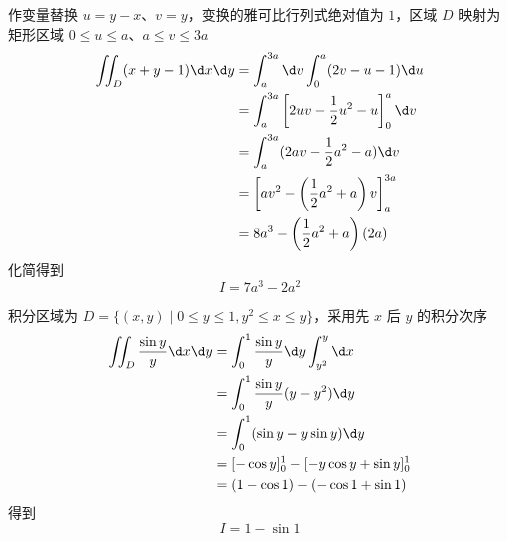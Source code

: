 \begin{solution}
    作变量替换 $u = y-x$、$v = y$，变换的雅可比行列式绝对值为 $1$，区域 $D$ 映射为矩形区域 $0 \le u \le a$、$a \le v \le 3a$
    \begin{equation}
        \begin{aligned}
            \iint_{D} (x+y-1) \d x \d y & = \int_{a}^{3 a} \d v \int_{0}^{a} (2 v - u - 1) \d u                       \\
                                        & = \int_{a}^{3 a} \left[ 2 u v - \frac{1}{2} u^{2} - u \right]_{0}^{a} \d v  \\
                                        & = \int_{a}^{3 a} (2 a v - \frac{1}{2} a^{2} - a) \d v                       \\
                                        & = \left[ a v^{2} - \left( \frac{1}{2} a^{2} + a \right) v \right]_{a}^{3 a} \\
                                        & = 8 a^{3} - \left( \frac{1}{2} a^{2} + a \right) (2 a)
        \end{aligned}
    \end{equation}
    化简得到
    \begin{equation}
        I = \boxed{7 a^{3}-2 a^{2}}
    \end{equation}


    积分区域为 $D = \{ (x, y) \mid 0 \le y \le 1, y^{2} \le x \le y \}$，采用先 $x$ 后 $y$ 的积分次序
    \begin{equation}
        \begin{aligned}
            \iint_{D} \frac{\sin y}{y} \d x \d y & = \int_{0}^{1} \frac{\sin y}{y} \d y \int_{y^{2}}^{y} \d x \\
                                                 & = \int_{0}^{1} \frac{\sin y}{y} (y - y^{2}) \d y           \\
                                                 & = \int_{0}^{1} (\sin y - y \sin y) \d y                    \\
                                                 & = [-\cos y]_{0}^{1} - [ -y \cos y + \sin y ]_{0}^{1}       \\
                                                 & = (1 - \cos 1) - (- \cos 1 + \sin 1)
        \end{aligned}
    \end{equation}
    得到
    \begin{equation}
        I = \boxed{1-\sin 1}
    \end{equation}


\end{solution}
